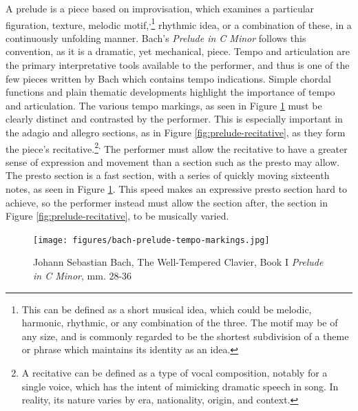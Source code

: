 A prelude is a piece based on improvisation, which examines a particular figuration, texture, melodic motif,\autocite{Drabkin_2001}\textsuperscript{,}\footnote{This can be defined as a short musical idea, which could be melodic, harmonic, rhythmic, or any combination of the three. The motif may be of any size, and is commonly regarded to be the shortest subdivision of a theme or phrase which maintains its identity as an idea.} rhythmic idea, or a combination of these, in a continuously unfolding manner. Bach's \textit{Prelude in C Minor} follows this convention, as it is a dramatic, yet mechanical, piece. Tempo and articulation are the primary interpretative tools available to the performer, and thus is one of the few pieces written by Bach which contains tempo indications. Simple chordal functions and plain thematic developments highlight the importance of tempo and articulation. The various tempo markings, as seen in Figure \ref{fig:prelude-tempo-markings}\autocite{Henle_2009} must be clearly distinct and contrasted by the performer. This is especially important in the adagio and allegro sections, as in Figure \ref{fig:prelude-recitative}\autocite{Henle_2009},
as they form the piece's recitative.\footnote{A recitative can be defined as a type of vocal composition, notably for a single voice, which has the intent of mimicking dramatic speech in song. In reality, its nature varies by era, nationality, origin, and context.}\textsuperscript{,}\autocite{Monson_Westrup_Budden_2001} The performer must allow the recitative to have a greater sense of expression and movement than a section such as the presto may allow. The presto section is a fast section, with a series of quickly moving sixteenth notes, as seen in Figure \ref{fig:prelude-tempo-markings}\autocite{Henle_2009}. This speed makes an expressive presto section hard to achieve, so the performer instead must allow the section after, the section in Figure \ref{fig:prelude-recitative}\autocite{Henle_2009}, to be musically varied. 

\begin{figure}
    \centering
    \texttt{[image: figures/bach-prelude-tempo-markings.jpg]}
    \caption{Johann Sebastian Bach, The Well-Tempered Clavier, Book I \textit{Prelude in C Minor}, mm. 28-36}
    \label{fig:prelude-tempo-markings}
\end{figure}

